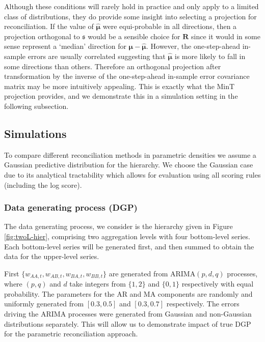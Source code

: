 \documentclass[12pt]{article}
\theoremstyle{definition}
\begin{document}
Although these conditions will rarely hold in practice and only apply to a limited class of distributions, they do provide some insight into selecting a projection for reconciliation. If the value of $\hat{\bm{\mu}}$ were equi-probable in all directions, then a projection orthogonal to $\mathfrak{s}$ would be a sensible choice for $\bm{R}$ since it would in some sense represent a `median' direction for $\bm{\mu}-\hat{\bm{\mu}}$. However, the one-step-ahead in-sample errors are usually correlated suggesting that $\hat{\bm{\mu}}$ is more likely to fall in some directions than others. Therefore an orthogonal projection after transformation by the inverse of the one-step-ahead in-sample error covariance matrix may be more intuitively appealing. This is exactly what the MinT projection provides, and we demonstrate this in a simulation setting in the following subsection.

\subsection{Simulations}

To compare different reconciliation methods in parametric densities we assume a Gaussian predictive distribution for the hierarchy. We choose the Gaussian case due to its analytical tractability which allows for evaluation using all scoring rules (including the log score).


\subsubsection{Data generating process (DGP)} \label{subsec:DGP}

The data generating process, we consider is the hierarchy given in Figure \ref{fig:twoL-hier}, comprising two aggregation levels with four bottom-level series. Each bottom-level series will be generated first, and then summed to obtain the data for the upper-level series.

First $\{w_{AA,t},w_{AB,t},w_{BA,t},w_{BB,t}\}$ are generated from ARIMA$(p,d,q)$ processes, where $(p,q)$ and $d$ take integers from $\{1,2\}$ and $\{0,1\}$ respectively with equal probability. The parameters for the AR and MA components are randomly and uniformly generated from $[0.3,0.5]$ and $[0.3,0.7]$ respectively.
The errors driving the ARIMA processes were generated from Gaussian and non-Gaussian distributions separately. This will allow us to demonstrate impact of true DGP for the parametric reconciliation approach.
\end{document}

